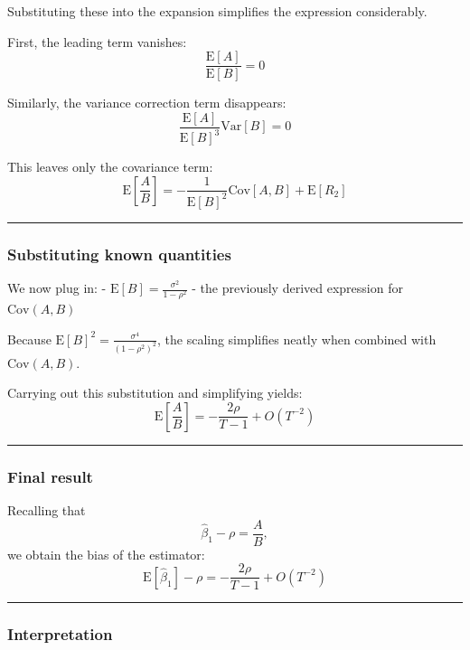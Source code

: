 \documentclass[11pt]{article}
\begin{document}
Substituting these into the expansion simplifies the expression
considerably.

First, the leading term vanishes: \[
\frac{\text{E}[A]}{\text{E}[B]} = 0
\]

Similarly, the variance correction term disappears: \[
\frac{\text{E}[A]}{\text{E}[B]^3}\text{Var}\left[B\right] = 0
\]

This leaves only the covariance term: \[
\text{E}\left[\frac{A}{B}\right]
=-\frac{1}{\text{E}[B]^2}\text{Cov}\left[A,B\right]
+\text{E}\left[R_2\right]
\]

\begin{center}\rule{0.5\linewidth}{0.5pt}\end{center}

\subsubsection{Substituting known
quantities}\label{substituting-known-quantities}

We now plug in: - \(\text{E}[B] = \frac{\sigma^2}{1-\rho^2}\) - the
previously derived expression for \(\text{Cov}(A,B)\)

Because \(\text{E}[B]^2 = \frac{\sigma^4}{(1-\rho^2)^2}\), the scaling
simplifies neatly when combined with \(\text{Cov}(A,B)\).

Carrying out this substitution and simplifying yields: \[
\text{E}\left[\frac{A}{B}\right]
= -\frac{2\rho}{T-1} + O(T^{-2})
\]

\begin{center}\rule{0.5\linewidth}{0.5pt}\end{center}

\subsubsection{Final result}\label{final-result}

Recalling that \[
\hat\beta_1 - \rho = \frac{A}{B},
\] we obtain the bias of the estimator: \[
\text{E}\left[\hat\beta_{1}\right]-\rho
= -\frac{2\rho}{T-1}+O(T^{-2})
\]

\begin{center}\rule{0.5\linewidth}{0.5pt}\end{center}

\subsubsection{Interpretation}\label{interpretation}
\end{document}
